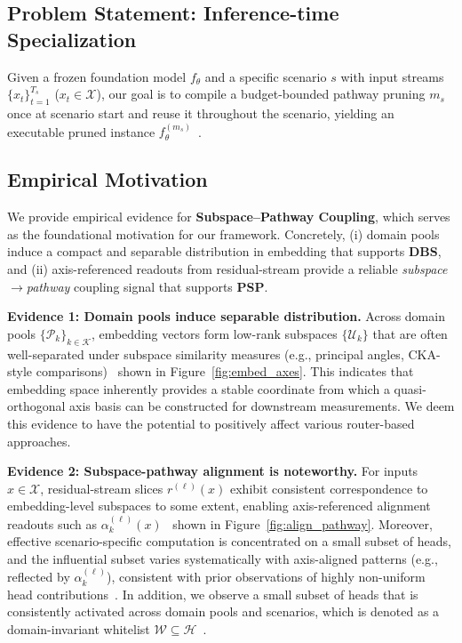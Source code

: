 \subsection{Problem Statement: Inference-time Specialization}
\label{sec:prelim_problem}
\vspace{-0.5mm}
Given a frozen foundation model $f_\theta$ and a specific scenario $s$ with input streams $\{x_t\}_{t=1}^{T_s}$ ($x_t\in\mathcal{X}$), our goal is to compile a budget-bounded pathway pruning $m_s$ once at scenario start and reuse it throughout the scenario, yielding an executable pruned instance $f_{\theta}^{(m_s)}$~\cite{wan2023efficientllm_survey}.

\subsection{Empirical Motivation}
\label{sec:prelim_empirical}
\vspace{-0.5mm}
We provide empirical evidence for \textbf{Subspace--Pathway Coupling}, which serves as the foundational motivation for our framework.
Concretely, (i) domain pools induce a compact and separable distribution in embedding that supports \textbf{DBS},
and (ii) axis-referenced readouts from residual-stream provide a reliable \emph{subspace$\rightarrow$pathway} coupling signal that supports \textbf{PSP}.

\textbf{Evidence 1: Domain pools induce separable distribution.}
Across domain pools $\{\mathcal{P}_k\}_{k\in\mathcal{K}}$, embedding vectors form low-rank subspaces $\{\mathcal{U}_k\}$ that are often well-separated under subspace similarity measures (e.g., principal angles, CKA-style comparisons)~\cite{kornblith2019similarity} shown in Figure~\ref{fig:embed_axes}.
This indicates that embedding space inherently provides a stable coordinate from which a quasi-orthogonal axis basis can be constructed for downstream measurements. We deem this evidence to have the potential to positively affect various router-based approaches.

\textbf{Evidence 2: Subspace-pathway alignment is noteworthy.}
For inputs $x\in\mathcal{X}$, residual-stream slices $r^{(\ell)}(x)$ exhibit consistent correspondence to embedding-level subspaces to some extent, enabling axis-referenced alignment readouts such as $\alpha^{(\ell)}_k(x)$~\cite{alain2016linearprobes,belinkov2022probing,tenney2019bertpipeline,hewitt2019structuralprobe,jawahar2019bertstructure} shown in Figure~\ref{fig:align_pathway}.
Moreover, effective scenario-specific computation is concentrated on a small subset of heads, and the influential subset varies systematically with axis-aligned patterns (e.g., reflected by $\alpha^{(\ell)}_k$), consistent with prior observations of highly non-uniform head contributions~\cite{michel2019sixteen,voita2019heads}.
In addition, we observe a small subset of heads that is consistently activated across domain pools and scenarios, which is denoted as a domain-invariant whitelist $\mathcal{W}\subseteq\mathcal{H}$~\cite{tenney2019bertpipeline,jawahar2019bertstructure,kovaleva2019darksecrets}.

